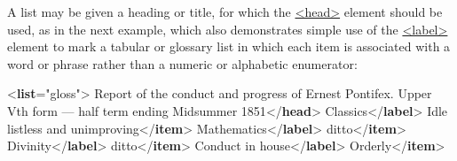 A list may be given a heading or title, for which the \hyperref[TEI.head]{<head>} element should be used, as in the next example, which also demonstrates simple use of the \hyperref[TEI.label]{<label>} element to mark a tabular or glossary list in which each item is associated with a word or phrase rather than a numeric or alphabetic enumerator: \par\bgroup{}\exampleFont \begin{shaded}\noindent\mbox{}{<\textbf{list}\hspace*{1em}{type}="{gloss}">}\mbox{}\newline 
{}Report of the conduct and progress of Ernest Pontifex.\mbox{}\newline 
\hspace*{1em}\hspace*{1em} Upper Vth form — half term ending Midsummer 1851{</\textbf{head}>}\mbox{}\newline 
{}Classics{</\textbf{label}>}\mbox{}\newline 
{}Idle listless and unimproving{</\textbf{item}>}\mbox{}\newline 
{}Mathematics{</\textbf{label}>}\mbox{}\newline 
{}ditto{</\textbf{item}>}\mbox{}\newline 
{}Divinity{</\textbf{label}>}\mbox{}\newline 
{}ditto{</\textbf{item}>}\mbox{}\newline 
{}Conduct in house{</\textbf{label}>}\mbox{}\newline 
{}Orderly{</\textbf{item}>}\mbox{}\newline 

\end{shaded}
